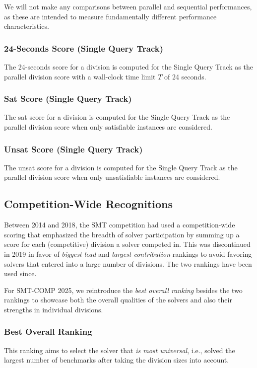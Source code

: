 \documentclass[12pt]{article}
\newcommand{\maintrack}{Single Query Track\xspace}
\begin{document}
We will not make any comparisons between parallel and sequential performances,
as these are intended to measure fundamentally different performance
characteristics.

\subsubsection{24-Seconds Score (\maintrack)}

The 24-seconds score for a division is computed for the \maintrack as the
parallel division score with a wall-clock time limit $T$ of 24 seconds.

\subsubsection{Sat Score (\maintrack)}

The sat score for a division is computed for the \maintrack as the
parallel division score when only satisfiable instances are considered.

\subsubsection{Unsat Score (\maintrack)}
The unsat score for a division is computed for the \maintrack as the
parallel division score when only unsatisfiable instances are considered.

\subsection{Competition-Wide Recognitions}

Between 2014 and 2018, the SMT competition had used a competition-wide scoring
that emphasized the breadth of solver participation by summing up a score for
each (competitive) division a solver competed in. This was discontinued in 2019
in favor of \emph{biggest lead} and \emph{largest contribution} rankings
to avoid favoring solvers that entered into a large number of divisions. The two
rankings have been used since.

For SMT-COMP 2025, we reintroduce the \emph{best overall ranking} besides the
two rankings to showcase both the overall qualities of the solvers and also
their strengths in individual divisions.

\subsubsection{Best Overall Ranking}
This ranking aims to select the solver that \emph{is most universal}, i.e.,
solved the largest number of benchmarks after taking the division sizes into
account.
\end{document}
